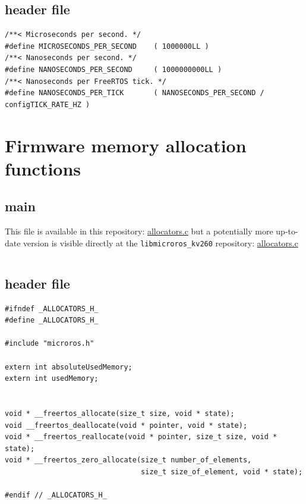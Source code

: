 \documentclass[10pt]{article}
\begin{document}
\inputminted[linenos, frame=single]{c}{./src/clock.c}

\subsection{header file}
\label{sec:org04636d0}
\begin{verbatim}
/**< Microseconds per second. */
#define MICROSECONDS_PER_SECOND    ( 1000000LL )  
/**< Nanoseconds per second. */
#define NANOSECONDS_PER_SECOND     ( 1000000000LL ) 
/**< Nanoseconds per FreeRTOS tick. */  
#define NANOSECONDS_PER_TICK       ( NANOSECONDS_PER_SECOND / configTICK_RATE_HZ ) 
\end{verbatim}


\clearpage
\section{Firmware memory allocation functions}
\label{sec:org9284958}

\subsection{main}
\label{sec:org5d2ddfe}
This file is available in this repository: \href{https://gitlab.com/sunoc/xilinx-kria-kv260-documentation/-/blob/b7300116e153f4b5a1542f8804e4646db8030033/src/allocators.c}{allocators.c}
but a potentially more up-to-date version is visible
directly at the \texttt{libmicroros\_kv260} repository: \href{https://gitlab.com/sunoc/libmicroros\_kv260/-/blob/4867e762f66af7b4647232eb4c0a31106db66e13/src/allocators.c}{allocators.c}

\inputminted[linenos, frame=single]{c}{./src/allocators.c}

\subsection{header file}
\label{sec:orgc0bdd1f}
\begin{verbatim}
#ifndef _ALLOCATORS_H_
#define _ALLOCATORS_H_

#include "microros.h"

extern int absoluteUsedMemory;
extern int usedMemory;


void * __freertos_allocate(size_t size, void * state);
void __freertos_deallocate(void * pointer, void * state);
void * __freertos_reallocate(void * pointer, size_t size, void * state);
void * __freertos_zero_allocate(size_t number_of_elements,
                                size_t size_of_element, void * state);

#endif // _ALLOCATORS_H_
\end{verbatim}
\end{document}
